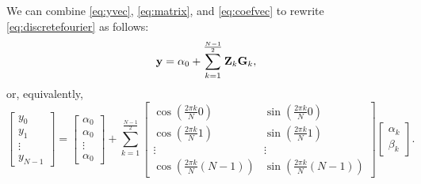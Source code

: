 \documentclass[11pt,twoside,a4paper]{article}
\begin{document}
We can combine \autoref{eq:yvec}, \autoref{eq:matrix}, and
\autoref{eq:coefvec} to rewrite \autoref{eq:discretefourier} as
follows:
\begin{equation}
  \label{eq:discretefourier_m}
  \mbox{{\bf y}} = \alpha_0 + \sum_{k=1}^{\frac{N-1}{2}}\mbox{{\bf Z}}_k\mbox{{\bf G}}_k,
\end{equation}
or, equivalently,
\begin{equation}
  \label{eq:discretefourier_mx}
  \left[\begin{array}{c}
      y_0\\y_1\\\vdots\\y_{N-1}
    \end{array}\right] = 
  \left[\begin{array}{c}
      \alpha_0\\\alpha_0\\\vdots\\\alpha_0
    \end{array}\right] + \sum_{k=1}^{\frac{N-1}{2}}
  \left[\begin{array}{cc}
    \cos\left(\frac{2\pi k}{N}0\right) & \sin\left(\frac{2\pi
        k}{N}0\right)\\
      \cos\left(\frac{2\pi
          k}{N}1\right) & \sin\left(\frac{2\pi k}{N}1\right)\\ \vdots
      & \vdots \\ 
      \cos\left(\frac{2\pi k}{N}(N-1)\right) & \sin\left(\frac{2\pi 
          k}{N}(N-1)\right)
    \end{array}\right]
  \left[\begin{array}{c}
      \alpha_k\\\beta_k
    \end{array}\right].
\end{equation}
\end{document}
